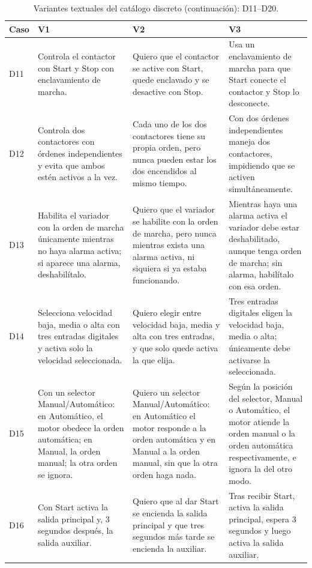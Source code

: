 \documentclass[a4paper,fleqn]{cas-dc}
\begin{document}
\begin{table}[!ht]
\centering
\footnotesize
\setlength{\tabcolsep}{4pt}
\renewcommand{\arraystretch}{1.10}
\addtocounter{table}{-1}
\caption{Variantes textuales del catálogo discreto (continuación): D11--D20.}
\begin{tabularx}{\textwidth}{@{}l >{\raggedright\arraybackslash}X >{\raggedright\arraybackslash}X >{\raggedright\arraybackslash}X@{}}
\toprule Caso & V1 & V2 & V3\\ \midrule
D11 & Controla el contactor con Start y Stop con enclavamiento de marcha. & Quiero que el contactor se active con Start, quede enclavado y se desactive con Stop. & Usa un enclavamiento de marcha para que Start conecte el contactor y Stop lo desconecte.\\
\addlinespace[2pt]
D12 & Controla dos contactores con órdenes independientes y evita que ambos estén activos a la vez. & Cada uno de los dos contactores tiene su propia orden, pero nunca pueden estar los dos encendidos al mismo tiempo. & Con dos órdenes independientes maneja dos contactores, impidiendo que se activen simultáneamente.\\
\addlinespace[2pt]
D13 & Habilita el variador con la orden de marcha únicamente mientras no haya alarma activa; si aparece una alarma, deshabilítalo. & Quiero que el variador se habilite con la orden de marcha, pero nunca mientras exista una alarma activa, ni siquiera si ya estaba funcionando. & Mientras haya una alarma activa el variador debe estar deshabilitado, aunque tenga orden de marcha; sin alarma, habilítalo con esa orden.\\
\addlinespace[2pt]
D14 & Selecciona velocidad baja, media o alta con tres entradas digitales y activa solo la velocidad seleccionada. & Quiero elegir entre velocidad baja, media y alta con tres entradas, y que solo quede activa la que elija. & Tres entradas digitales eligen la velocidad baja, media o alta; únicamente debe activarse la seleccionada.\\
\addlinespace[2pt]
D15 & Con un selector Manual/Automático: en Automático, el motor obedece la orden automática; en Manual, la orden manual; la otra orden se ignora. & Quiero un selector Manual/Automático: en Automático el motor responde a la orden automática y en Manual a la orden manual, sin que la otra orden haga nada. & Según la posición del selector, Manual o Automático, el motor atiende la orden manual o la orden automática respectivamente, e ignora la del otro modo.\\
\addlinespace[2pt]
D16 & Con Start activa la salida principal y, 3 segundos después, la salida auxiliar. & Quiero que al dar Start se encienda la salida principal y que tres segundos más tarde se encienda la auxiliar. & Tras recibir Start, activa la salida principal, espera 3 segundos y luego activa la salida auxiliar.\\

\end{tabularx}
\end{table}
\end{document}
